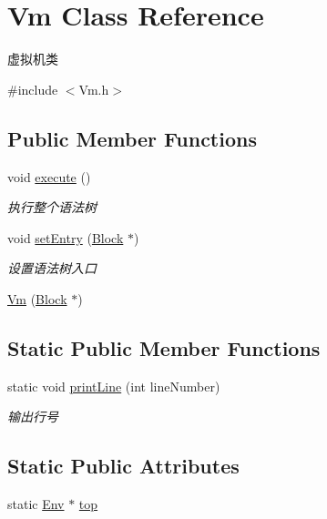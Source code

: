 \hypertarget{class_vm}{}\section{Vm Class Reference}
\label{class_vm}


虚拟机类  




{\ttfamily \#include $<$Vm.\+h$>$}

\subsection*{Public Member Functions}
\begin{DoxyCompactItemize}
\item 
void \hyperlink{class_vm_a37a0791ef2b63e41421446993d0e7e4d}{execute} ()
\begin{DoxyCompactList}\small\item\em 执行整个语法树 \end{DoxyCompactList}\item 
void \hyperlink{class_vm_af036edc52fab207ca28530c06b6d0c67}{set\+Entry} (\hyperlink{class_block}{Block} $\ast$)
\begin{DoxyCompactList}\small\item\em 设置语法树入口 \end{DoxyCompactList}\item 
\hyperlink{class_vm_a4a37106b5b5b9382baa79dea901db8ba}{Vm} (\hyperlink{class_block}{Block} $\ast$)
\end{DoxyCompactItemize}
\subsection*{Static Public Member Functions}
\begin{DoxyCompactItemize}
\item 
static void \hyperlink{class_vm_a376141bb4182218ac7a499043eb18a6c}{print\+Line} (int line\+Number)
\begin{DoxyCompactList}\small\item\em 输出行号 \end{DoxyCompactList}\end{DoxyCompactItemize}
\subsection*{Static Public Attributes}
\begin{DoxyCompactItemize}
\item 
static \hyperlink{class_env}{Env} $\ast$ \hyperlink{class_vm_a1a83823801a5ab090d9ad20527a6c638}{top}
\end{DoxyCompactItemize}
